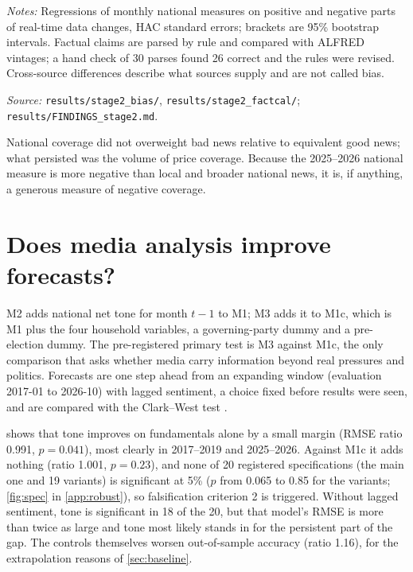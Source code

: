 \documentclass[11pt]{article}
\begin{document}
\begin{table}[htbp]
\begin{threeparttable}
\begin{tablenotes}[flushleft]\footnotesize
\item \textit{Notes:} Regressions of monthly national measures on positive and negative parts of real-time data changes, HAC standard errors; brackets are 95\% bootstrap intervals. Factual claims are parsed by rule and compared with ALFRED vintages; a hand check of 30 parses found 26 correct and the rules were revised. Cross-source differences describe what sources supply and are not called bias.
\item \textit{Source:} \texttt{results/stage2\_bias/}, \texttt{results/stage2\_factcal/}; \texttt{results/FINDINGS\_stage2.md}.
\end{tablenotes}
\end{threeparttable}
\end{table}

National coverage did not overweight bad news relative to equivalent good news; what persisted was the volume of price coverage. Because the 2025–2026 national measure is more negative than local and broader national news, it is, if anything, a generous measure of negative coverage.

\section{Does media analysis improve forecasts?}\label{sec:forecast}

M2 adds national net tone for month $t-1$ to M1; M3 adds it to M1c, which is M1 plus the four household variables, a governing-party dummy and a pre-election dummy. The pre-registered primary test is M3 against M1c, the only comparison that asks whether media carry information beyond real pressures and politics. Forecasts are one step ahead from an expanding window (evaluation 2017-01 to 2026-10) with lagged sentiment, a choice fixed before results were seen, and are compared with the Clark–West test \citep{clark2007}.

 shows that tone improves on fundamentals alone by a small margin (RMSE ratio 0.991, $p = 0.041$), most clearly in 2017–2019 and 2025–2026. Against M1c it adds nothing (ratio 1.001, $p = 0.23$), and none of 20 registered specifications (the main one and 19 variants) is significant at 5\% ($p$ from 0.065 to 0.85 for the variants; \cref{fig:spec} in \cref{app:robust}), so falsification criterion 2 is triggered. Without lagged sentiment, tone is significant in 18 of the 20, but that model's RMSE is more than twice as large and tone most likely stands in for the persistent part of the gap. The controls themselves worsen out-of-sample accuracy (ratio 1.16), for the extrapolation reasons of \cref{sec:baseline}.
\end{document}
